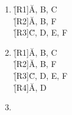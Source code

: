 \documentclass{bschlangaul-aufgabe}
\begin{document}
\begin{enumerate}
\begin{bAntwort}
\begin{enumerate}
\begin{enumerate}
\item {}

\bNichtsZuTun

\item {}

\bNichtsZuTun

\end{enumerate}
\item {}

\r[R1]{\u{A, B}, C}\\
\r[R2]{\u{A, B}, F}\\
\r[R3]{\u{C, D}, E, F}\\

\item {}

\r[R1]{\u{A, B}, C}\\
\r[R2]{\u{A, B}, F}\\
\r[R3]{\u{C, D}, E, F}\\
\r[R4]{\u{A, D}}\\

\item {}

\bNichtsZuTun
\end{enumerate}
\end{bAntwort}

\end{enumerate}
\end{document}
